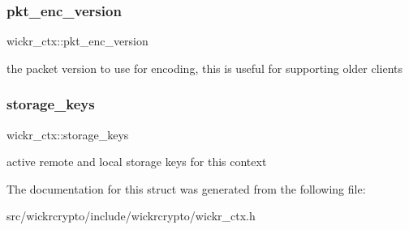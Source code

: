 \subsubsection{\texorpdfstring{pkt\+\_\+enc\+\_\+version}{pkt\_enc\_version}}
{\footnotesize\ttfamily wickr\+\_\+ctx\+::pkt\+\_\+enc\+\_\+version}

the packet version to use for encoding, this is useful for supporting older clients \mbox{\label{structwickr__ctx_ab6d3ad69a6a16c0f582186b9d8461b66}} 
\subsubsection{\texorpdfstring{storage\+\_\+keys}{storage\_keys}}
{\footnotesize\ttfamily wickr\+\_\+ctx\+::storage\+\_\+keys}

active remote and local storage keys for this context 

The documentation for this struct was generated from the following file\+:\begin{DoxyCompactItemize}
\item 
src/wickrcrypto/include/wickrcrypto/wickr\+\_\+ctx.\+h\end{DoxyCompactItemize}
